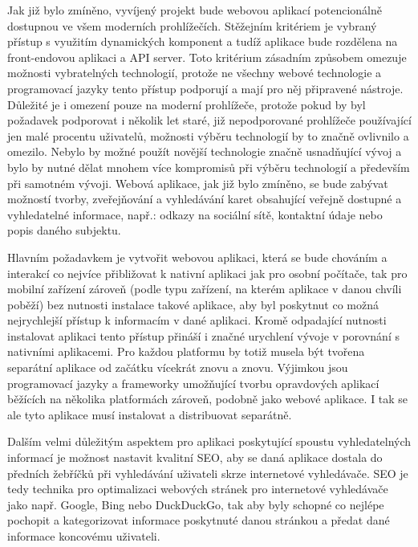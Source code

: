 		Jak již bylo zmíněno, vyvíjený projekt bude webovou aplikací potencionálně dostupnou ve všem moderních prohlížečích.
		Stěžejním kritériem je vybraný přístup s využitím dynamických komponent a tudíž aplikace bude rozdělena
		na front-endovou aplikaci a \ac{API} server.
		Toto kritérium zásadním způsobem omezuje možnosti vybratelných technologií, protože ne všechny webové technologie
		a programovací jazyky tento přístup podporují a mají pro něj připravené nástroje.
		Důležité je i omezení pouze na moderní prohlížeče, protože pokud by byl požadavek podporovat i několik let staré,
		již nepodporované prohlížeče používající jen malé procentu uživatelů, možnosti výběru technologií by to značně
		ovlivnilo a omezilo.
		Nebylo by možné použít novější technologie značně usnadňující vývoj a bylo by nutné dělat mnohem více kompromisů
		při výběru technologií a především při samotném vývoji.
		Webová aplikace, jak již bylo zmíněno, se bude zabývat možností tvorby, zveřejňování a vyhledávání
		karet obsahující veřejně dostupné a vyhledatelné informace, např.: odkazy na sociální sítě,
		kontaktní údaje nebo popis daného subjektu.

		Hlavním požadavkem je vytvořit webovou aplikaci, která se bude chováním a interakcí co nejvíce přibližovat
		k nativní aplikaci jak pro osobní počítače, tak pro mobilní zařízení zároveň (podle typu zařízení, na kterém aplikace
		v danou chvíli poběží) bez nutnosti instalace takové aplikace, aby byl poskytnut co možná nejrychlejší přístup
		k informacím v dané aplikaci.
		Kromě odpadající nutnosti instalovat aplikaci tento přístup přináší i značné urychlení vývoje v porovnání s
		nativními aplikacemi.
		Pro každou platformu by totiž musela být tvořena separátní aplikace od začátku vícekrát znovu a znovu.
		Výjimkou jsou programovací jazyky a frameworky umožňující tvorbu opravdových aplikací běžících na několika
		platformách zároveň, podobně jako webové aplikace.
		I tak se ale tyto aplikace musí instalovat a distribuovat separátně.

		Dalším velmi důležitým aspektem pro aplikaci poskytující spoustu vyhledatelných informací je možnost nastavit
		kvalitní SEO, aby se daná aplikace dostala do předních žebříčků při vyhledávání uživateli skrze internetové
		vyhledávače.
		\noindent\Ac{SEO} je tedy technika pro optimalizaci webových stránek pro internetové vyhledávače jako např.
		Google, Bing nebo DuckDuckGo, tak aby byly schopné co nejlépe pochopit a kategorizovat informace poskytnuté
		danou stránkou a předat dané informace koncovému uživateli. \cite{what_is_seo}

